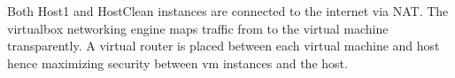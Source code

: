 \documentclass[12pt]{article}
\begin{document}



Both Host1 and Host\textunderscore Clean instances are connected to the internet via NAT. The virtualbox networking engine maps traffic from to the virtual machine transparently. A virtual router is placed between each virtual machine and host hence maximizing security between vm instances and the host.
\end{document}
